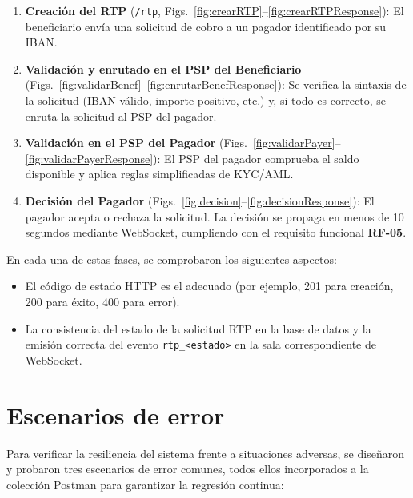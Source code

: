 \begin{enumerate}
  \item \textbf{Creación del RTP} (\texttt{/rtp}, Figs.~\ref{fig:crearRTP}–\ref{fig:crearRTPResponse}): El beneficiario envía una solicitud de cobro a un pagador identificado por su IBAN.
  
  \item \textbf{Validación y enrutado en el PSP del Beneficiario} (Figs.~\ref{fig:validarBenef}–\ref{fig:enrutarBenefResponse}): Se verifica la sintaxis de la solicitud (IBAN válido, importe positivo, etc.) y, si todo es correcto, se enruta la solicitud al PSP del pagador.
  
  \item \textbf{Validación en el PSP del Pagador} (Figs.~\ref{fig:validarPayer}–\ref{fig:validarPayerResponse}): El PSP del pagador comprueba el saldo disponible y aplica reglas simplificadas de KYC/AML.
  
  \item \textbf{Decisión del Pagador} (Figs.~\ref{fig:decision}–\ref{fig:decisionResponse}): El pagador acepta o rechaza la solicitud. La decisión se propaga en menos de 10 segundos mediante WebSocket, cumpliendo con el requisito funcional \textbf{RF-05}.
\end{enumerate}

En cada una de estas fases, se comprobaron los siguientes aspectos:

\begin{itemize}
  \item El código de estado HTTP es el adecuado (por ejemplo, 201 para creación, 200 para éxito, 400 para error).
  \item La consistencia del estado de la solicitud RTP en la base de datos y la emisión correcta del evento \texttt{rtp\_<estado>} en la sala correspondiente de WebSocket.
\end{itemize}

\section{Escenarios de error}

Para verificar la resiliencia del sistema frente a situaciones adversas, se diseñaron y probaron tres escenarios de error comunes, todos ellos incorporados a la colección Postman para garantizar la regresión continua:

